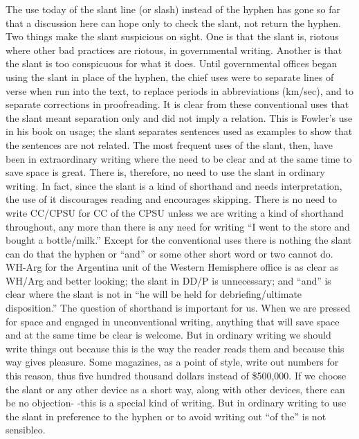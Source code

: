 \documentclass[
    oneside,
    11pt,
    draft
]{memoir}
\begin{document}
The use today of the slant line (or slash) instead of the hyphen has gone so far that a discussion here can hope only to check the slant, not return the hyphen. Two things make the slant suspicious on sight. One is that the slant is, riotous where other bad practices are riotous, in governmental writing. Another is that the slant is too conspicuous for what it does. Until governmental offices began using the slant in place of the hyphen, the chief uses were to separate lines of verse when run into the text, to replace periods in abbreviations (km/sec), and to separate corrections in proofreading. It is clear from these conventional uses that the slant meant separation only and did not imply a relation. This is Fowler's use in his book on usage; the slant separates sentences used as examples to show that the sentences are not related. The most frequent uses of the slant, then, have been in extraordinary writing where the need to be clear and at the same time to save space is great. There is, therefore, no need to use the slant in ordinary writing. In fact, since the slant is a kind of shorthand and needs interpretation, the use of it discourages reading and encourages skipping. There is no need to write CC/CPSU for CC of the CPSU unless we are writing a kind of shorthand throughout, any more than there is any need for writing \enquote{I went to the store and bought a bottle/milk.} Except for the conventional uses there is nothing the slant can do that the hyphen or \enquote{and} or some other short word or two cannot do. WH-Arg for the Argentina unit of the Western Hemisphere office is as clear as WH/Arg and better looking; the slant in DD/P is unnecessary; and \enquote{and} is clear where the slant is not in \enquote{he will be held for debriefing/ultimate disposition.} The question of shorthand is important for us. When we are pressed for space and engaged in unconventional writing, anything that will save space and at the same time be clear is welcome. But in ordinary writing we should write things out because this is the way the reader reads them and because this way gives pleasure. Some magazines, as a point of style, write out numbers for this reason, thus five hundred thousand dollars instead of \$500,000. If we choose the slant or any other device as a short way, along with other devices, there can be no objection- -this is a special kind of writing. But in ordinary writing to use the slant in preference to the hyphen or to avoid writing out \enquote{of the} is not sensibleo.
\end{document}
